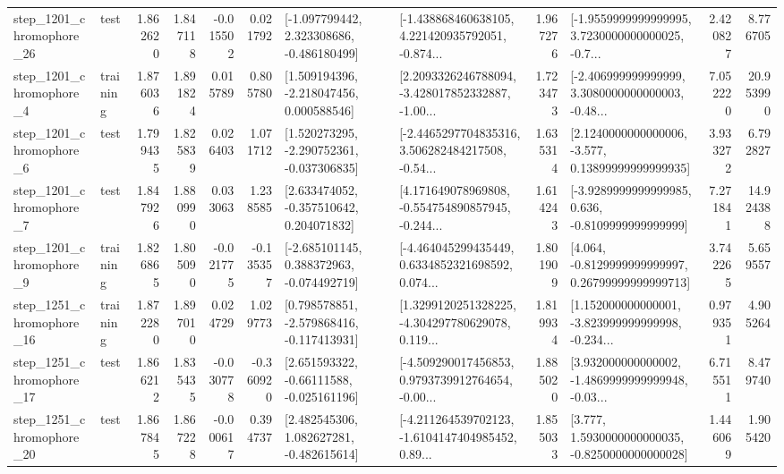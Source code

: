 \begin{tabular}{llrrrrllrlrr}
 step\_1201\_chromophore\_26 &      test &      1.862620 &    1.847118 &     -0.015502 &  0.021792 &   [-1.097799442, 2.323308686, -0.486180499] &  [-1.438868460638105, 4.221420935792051, -0.874... &       1.967276 &  [-1.9559999999999995, 3.7230000000000025, -0.7... &            2.420827 &          8.776705 \\
  step\_1201\_chromophore\_4 &  training &      1.876036 &    1.891824 &      0.015789 &  0.805780 &    [1.509194396, -2.218047456, 0.000588546] &  [2.2093326246788094, -3.428017852332887, -1.00... &       1.723473 &  [-2.406999999999999, 3.3080000000000003, -0.48... &            7.052220 &         20.953990 \\
  step\_1201\_chromophore\_6 &      test &      1.799435 &    1.825839 &      0.026403 &  1.071712 &   [1.520273295, -2.290752361, -0.037306835] &  [-2.4465297704835316, 3.506282484217508, -0.54... &       1.635314 &  [2.1240000000000006, -3.577, 0.13899999999999935] &            3.933272 &          6.792827 \\
  step\_1201\_chromophore\_7 &      test &      1.847926 &    1.880990 &      0.033063 &  1.238585 &    [2.633474052, -0.357510642, 0.204071832] &  [4.171649078969808, -0.554754890857945, -0.244... &       1.614243 &  [-3.9289999999999985, 0.636, -0.8109999999999999] &            7.271841 &         14.924388 \\
  step\_1201\_chromophore\_9 &  training &      1.826865 &    1.805090 &     -0.021775 & -0.135357 &   [-2.685101145, 0.388372963, -0.074492719] &  [-4.464045299435449, 0.6334852321698592, 0.074... &       1.801909 &  [4.064, -0.8129999999999997, 0.26799999999999713] &            3.742265 &          5.659557 \\
 step\_1251\_chromophore\_16 &  training &      1.872280 &    1.897010 &      0.024729 &  1.029773 &   [0.798578851, -2.579868416, -0.117413931] &  [1.3299120251328225, -4.304297780629078, 0.119... &       1.819934 &  [1.152000000000001, -3.823999999999998, -0.234... &            0.979351 &          4.905264 \\
 step\_1251\_chromophore\_17 &      test &      1.866212 &    1.835435 &     -0.030778 & -0.360920 &    [2.651593322, -0.66111588, -0.025161196] &  [-4.509290017456853, 0.9793739912764654, -0.00... &       1.885020 &  [3.932000000000002, -1.4869999999999948, -0.03... &            6.715511 &          8.479740 \\
 step\_1251\_chromophore\_20 &      test &      1.867845 &    1.867228 &     -0.000617 &  0.394737 &    [2.482545306, 1.082627281, -0.482615614] &  [-4.211264539702123, -1.6104147404985452, 0.89... &       1.855033 &   [3.777, 1.5930000000000035, -0.8250000000000028] &            1.446069 &          1.905420 \\

\end{tabular}
